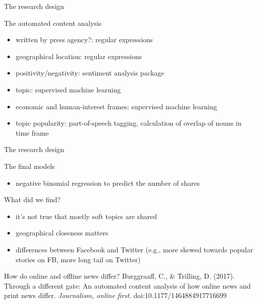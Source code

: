 \documentclass{beamer}
\begin{document}
\begin{frame}{The research design}
	\begin{block}{The automated content analysis}
		\begin{itemize}
		\item written by press agency?: regular expressions
		\item geographical location: regular expressions
		\item positivity/negativity: sentiment analysis package
		\item topic: supervised machine learning
		\item economic and human-interest frames: supervised machine learning
		\item topic popularity: part-of-speech tagging, calculation of overlap of nouns in time frame
		\end{itemize}
	\end{block}
\end{frame}



\begin{frame}{The research design}
	\begin{block}{The final models}
		\begin{itemize}
		\item negative binomial regression to predict the number of shares
		\end{itemize}
	\end{block}
\end{frame}

\begin{frame}{What did we find?}
	\begin{itemize}
		\item it's not true that mostly soft topics are shared
		\item geographical closeness matters
		\item differences between Facebook and Twitter (e.g., more skewed towards popular stories on FB, more long tail on Twitter)
	\end{itemize}
\end{frame}


\begin{frame}{How do online and offline news differ?}
Burggraaff, C., \& Trilling, D. (2017). Through a different gate: An automated content analysis of how online news and print news differ. \textit{Journalism, online first}. doi:10.1177/1464884917716699
\end{frame}
\end{document}
